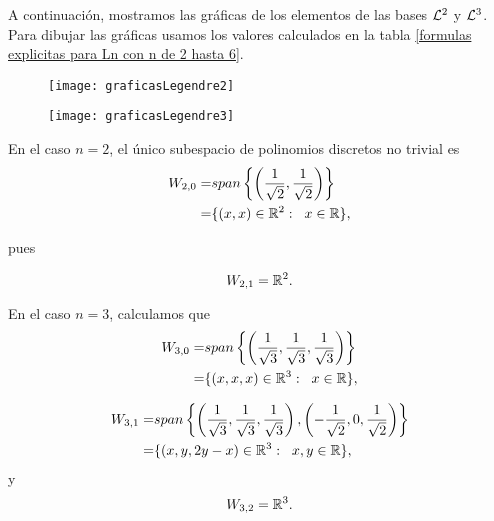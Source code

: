 \begin{ejemplo}
A continuación, mostramos las gráficas de los
elementos de las bases $\mathcal{L}^{2}$ y $\mathcal{L}^{3}$.
Para dibujar las gráficas usamos los valores
calculados en la tabla
\ref{formulas explicitas para Ln con n de 2 hasta 6}.

\begin{figure}[H]
	\centering
	\texttt{[image: graficasLegendre2]} 
\end{figure}	


\begin{figure}[H]
	\centering
	\texttt{[image: graficasLegendre3]} 
\end{figure}	




En el caso $n=2$, el único subespacio de polinomios
discretos no trivial es 
\begin{align*}
W_{2,0}= & span \left\{ 
\left(\frac{1}{\sqrt2}, \frac{1}{\sqrt2} \right) \right\} \\
= & \{ (x,x) \in \mathbb{R}^{2}: \hspace{0.2cm} x \in \mathbb{R} \},
\end{align*}

pues

\begin{equation}
\label{eq1: 1Dic}
W_{2,1}= \mathbb{R}^{2}.
\end{equation}


En el caso $n=3$, calculamos que
\begin{align*}
W_{3,0}= & span \left\{
\left( \frac{1}{\sqrt3}, \frac{1}{\sqrt3},
\frac{1}{\sqrt3} \right) \right\}  \\
= & \{ (x,x,x) \in \mathbb{R}^{3}: \hspace{0.2cm} x \in \mathbb{R} \},
\end{align*}

\begin{align}
\label{eq2: 1Dic}
W_{3,1}= & span \left\{ \left( \frac{1}{\sqrt3}, \frac{1}{\sqrt3},
\frac{1}{\sqrt3} \right) ,
\left( -\frac{1}{\sqrt2}, 0,  \frac{1}{\sqrt2} \right) \right\}
\nonumber \\
= & \{ (x,y,2y-x) \in \mathbb{R}^{3}: \hspace{0.2cm} x,y \in \mathbb{R} \},
\end{align}
y
\[
W_{3,2}=\mathbb{R}^{3}.
\]


\end{ejemplo}
